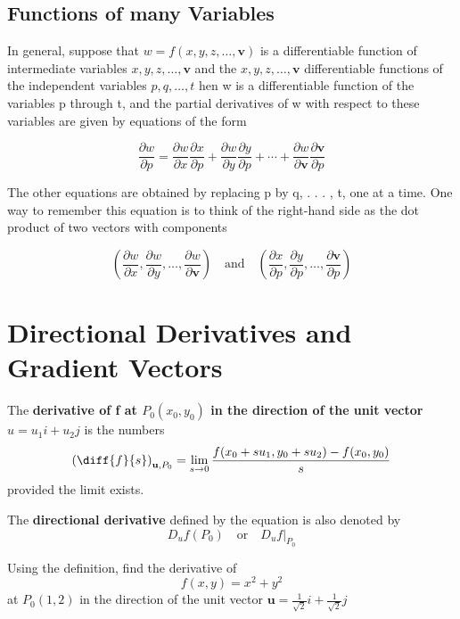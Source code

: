 \documentclass[12pt,a4paper,draft]{article}
\newenvironment{definition}{\begin{definitionbox}}{\end{definitionbox}\vspace{1\baselineskip}}
\begin{document}
\subsection{Functions of many Variables}

In general, suppose that \(w = f(x,y,z, \dots, \mathbf{v})\) is a differentiable function of intermediate variables \(x,y,z, \dots, \mathbf{v}\) and the \(x,y,z, \dots, \mathbf{v}\) differentiable functions of the independent variables \(p,q, \dots, t\) hen w is a differentiable
function of the variables p through t, and the partial derivatives of w with respect to these variables are given by equations of the form

\[\frac{\partial w}{\partial p}=\frac{\partial w}{\partial x} \frac{\partial x}{\partial p}+\frac{\partial w}{\partial y} \frac{\partial y}{\partial p}+\cdots+\frac{\partial w}{\partial \boldsymbol{v}} \frac{\partial \boldsymbol{v}}{\partial p}\]


The other equations are obtained by replacing p by q, . . . , t, one at a time. One way to remember this equation is to think of the right-hand side as the dot product of two vectors with components

\[\left(\frac{\partial w}{\partial x}, \frac{\partial w}{\partial y}, \dots, \frac{\partial w}{\partial \mathbf{v}}\right) \quad \text{and} \quad \left(\frac{\partial x}{\partial p}, \frac{\partial y}{\partial p}, \dots, \frac{\partial \mathbf{v}}{\partial p}\right)\]


\section{Directional Derivatives and Gradient Vectors}

\begin{definition}
    The \textbf{derivative of f at \(P_0(x_0,y_0)\) in the direction of the unit vector \(u = u_1i + u_2j\)} is the numbers
    \[\left(\diff{f}{s}\right)_{\mathbf{u}, P_0} = \lim_{s \to 0}\frac{f(x_0+ su_1, y_0 + su_2) - f(x_0,y_0)}{s}\]
    provided the limit exists.
\end{definition}

The \textbf{directional derivative} defined by the equation is also denoted by
\[D_uf(P_0) \quad \text{or} \quad D_uf|_{P_0} \]

\begin{example}
    Using the definition, find the derivative of
    \[f(x,y)= x^2 + y^2\]
    at \(P_0(1,2)\) in the direction of the unit vector \(\mathbf{u} = \frac{1}{\sqrt{2}}i + \frac{1}{\sqrt{2}}j \)
\end{example}
\end{document}
